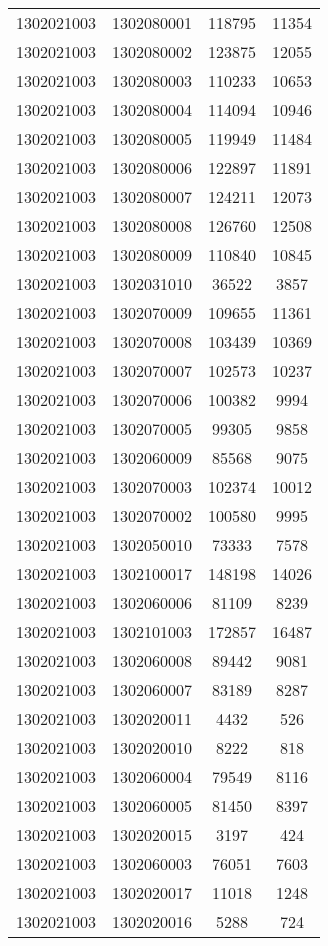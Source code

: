 \begin{longtable}[h]{llcc}
		1302021003 & 1302080001 & 118795 & 11354\\
		1302021003 & 1302080002 & 123875 & 12055\\
		1302021003 & 1302080003 & 110233 & 10653\\
		1302021003 & 1302080004 & 114094 & 10946\\
		1302021003 & 1302080005 & 119949 & 11484\\
		1302021003 & 1302080006 & 122897 & 11891\\
		1302021003 & 1302080007 & 124211 & 12073\\
		1302021003 & 1302080008 & 126760 & 12508\\
		1302021003 & 1302080009 & 110840 & 10845\\
		1302021003 & 1302031010 & 36522 & 3857\\
		1302021003 & 1302070009 & 109655 & 11361\\
		1302021003 & 1302070008 & 103439 & 10369\\
		1302021003 & 1302070007 & 102573 & 10237\\
		1302021003 & 1302070006 & 100382 & 9994\\
		1302021003 & 1302070005 & 99305 & 9858\\
		1302021003 & 1302060009 & 85568 & 9075\\
		1302021003 & 1302070003 & 102374 & 10012\\
		1302021003 & 1302070002 & 100580 & 9995\\
		1302021003 & 1302050010 & 73333 & 7578\\
		1302021003 & 1302100017 & 148198 & 14026\\
		1302021003 & 1302060006 & 81109 & 8239\\
		1302021003 & 1302101003 & 172857 & 16487\\
		1302021003 & 1302060008 & 89442 & 9081\\
		1302021003 & 1302060007 & 83189 & 8287\\
		1302021003 & 1302020011 & 4432 & 526\\
		1302021003 & 1302020010 & 8222 & 818\\
		1302021003 & 1302060004 & 79549 & 8116\\
		1302021003 & 1302060005 & 81450 & 8397\\
		1302021003 & 1302020015 & 3197 & 424\\
		1302021003 & 1302060003 & 76051 & 7603\\
		1302021003 & 1302020017 & 11018 & 1248\\
		1302021003 & 1302020016 & 5288 & 724\\

\end{longtable}
